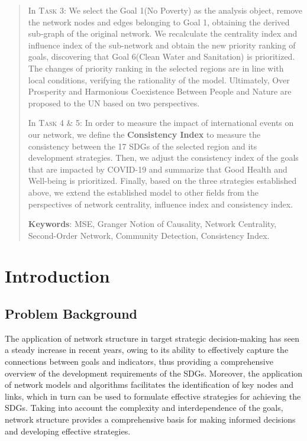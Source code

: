 \documentclass[12pt]{article}  %
\begin{document}
\begin{abstract}
In \textsc{Task 3: } 
We select the Goal 1(No Poverty) as the analysis object, remove the network nodes and edges belonging to Goal 1, obtaining the derived sub-graph of the original network. We recalculate the centrality index and influence index of the sub-network and obtain the new priority ranking of goals, discovering that Goal 6(Clean Water and Sanitation) is prioritized. The changes of priority ranking in the selected regions are in line with local conditions, verifying the rationality of the model. Ultimately, Over Prosperity and Harmonious Coexistence Between People and Nature are proposed to the UN based on two perspectives.

In \textsc{Task 4 \&  5:}
In order to measure the impact of international events on our network, we define the \textbf{Consistency Index} to measure the consistency between the 17 SDGs of the selected region and its development strategies. Then, we adjust the consistency index of the goals that are impacted by COVID-19 and summarize that Good Health and Well-being is prioritized. Finally, based on the three strategies established above, we extend the established model to other fields from the perspectives of network centrality, influence index and  consistency index.

    \vspace{5pt}
    \noindent \textbf{Keywords}:
    MSE, Granger Notion of Causality, Network Centrality, Second-Order Network, Community Detection, Consistency Index.

\end{abstract}


\maketitle  %
\tableofcontents  %


\section{Introduction}
\subsection{Problem Background}
The application of network structure in target strategic decision-making has seen a steady increase in recent years, owing to its ability to effectively capture the connections between goals and indicators, thus providing a comprehensive overview of the development requirements of the SDGs. Moreover, the application of network models and algorithms facilitates the identification of key nodes and links, which in turn can be used to formulate effective strategies for achieving the SDGs. Taking into account the complexity and interdependence of the goals, network structure provides a comprehensive basis for making informed decisions and developing effective strategies.
\end{document}
